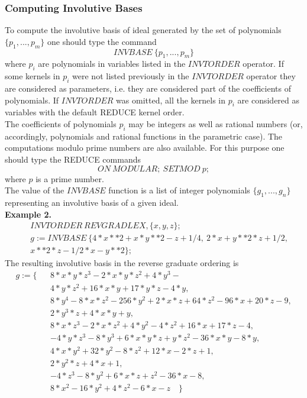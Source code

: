 \subsubsection{Computing Involutive Bases}
To compute the involutive basis of ideal generated by the set of
polynomials $\{p_1,...,p_m\}$ one should type the command
$$ INVBASE \> \{p_1,...,p_m\} $$
where $p_i$ are polynomials in variables listed in the
$INVTORDER$ operator. If some kernels in $p_i$ were not listed
previously in the $INVTORDER$ operator they are considered as
parameters, i.e. they are considered part of the coefficients of
polynomials. If $INVTORDER$ was omitted, all the kernels
in $p_i$ are considered as variables with the default REDUCE
kernel order.\\
The coefficients of polynomials $p_i$ may be integers as well as
rational numbers (or, accordingly, polynomials and rational functions
in the parametric case). The computations modulo prime numbers are
also available. For this purpose one should type the REDUCE commands
$$ ON \> MODULAR;\> SETMOD \> p; $$
where $p$ is a prime number.\\
The value of the $INVBASE$ function is a list of integer polynomials
$\{g_1,...,g_n\}$ representing an involutive basis of a given ideal.\\
\noindent
\textbf{Example 2.}
\begin{eqnarray*}
& & INVTORDER \> REVGRADLEX,\{x,y,z\}; \\
& & g:= INVBASE \> \{4*x**2 + x*y**2 - z + 1/4,\>
                     2*x + y**2*z + 1/2,\> \\
& &    x**2*z - 1/2*x - y**2 \};
\end{eqnarray*}
The resulting involutive basis in the reverse graduate ordering is
\begin{eqnarray*}
g := \{& & 8*x*y*z^3  - 2*x*y*z^2  + 4*y^3  - \\
& &  4*y*z^2 + 16*x*y + 17*y*z - 4*y,\\
& &  8*y^4  - 8*x*z^2  - 256*y^2  + 2*x*z + 64*z^2  - 96*x + 20*z - 9,\\
& &  2*y^3*z + 4*x*y + y,\\
& &  8*x*z^3  - 2*x*z^2  + 4*y^2  - 4*z^2 + 16*x + 17*z - 4,\\
& & - 4*y*z^3  - 8*y^3  + 6*x*y*z + y*z^2  - 36*x*y - 8*y,\\
& &  4*x*y^2  + 32*y^2  - 8*z^2  + 12*x - 2*z + 1,\\
& &  2*y^2*z + 4*x + 1,\\
& & - 4*z^3  - 8*y^2  + 6*x*z + z^2  - 36*x - 8,\\
& &  8*x^2  - 16*y^2  + 4*z^2  - 6*x - z \quad \}
\end{eqnarray*}
